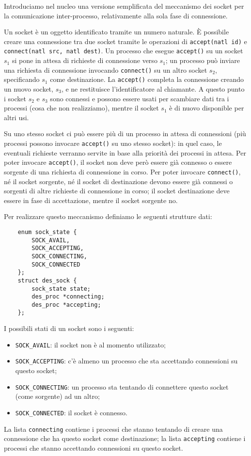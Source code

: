 Introduciamo nel nucleo una versione semplificata del meccanismo dei socket per
la comunicazione inter-processo, relativamente alla sola fase di connessione.

Un socket \`e un oggetto identificato tramite un numero naturale. \`E possibile
creare una connessione tra due socket tramite le operazioni di
\verb|accept(natl id)| e \verb|connect(natl src, natl dest)|.
Un processo che esegue \verb|accept()|
su un socket $s_1$ si pone in attesa di richieste di connessione verso $s_1$;
un processo pu\`o inviare una richiesta di connessione invocando \verb|connect()|
su un altro socket $s_2$, specificando $s_1$ come destinazione.
La \verb|accept()| completa la connessione creando un nuovo socket, $s_3$, e
ne restituisce l'identificatore al chiamante. A questo punto i socket $s_2$ e $s_3$
sono connessi e possono essere usati per scambiare dati tra i processi (cosa che
non realizziamo), mentre il socket $s_1$ \`e di nuovo disponible per altri usi.

Su uno stesso socket ci pu\`o essere pi\`u di un processo in attesa di connessioni
(pi\`u processi possono invocare \verb|accept()| su uno stesso socket):
in quel caso, le eventuali richieste verranno servite in base alla priorit\`a dei
processi in attesa. Per poter invocare \verb|accept()|, il socket non deve
per\`o essere gi\`a connesso o essere sorgente di una richiesta di connessione in corso.
Per poter invocare \verb|connect()|, n\'e il socket sorgente, n\'e il socket
di destinazione devono essere gi\`a connessi o sorgenti di altre richieste di connessione in corso;
il socket destinazione deve essere in fase di accettazione, mentre il socket sorgente no.

Per realizzare questo meccanismo definiamo le seguenti strutture dati:

\begin{verbatim}
    enum sock_state {
        SOCK_AVAIL,
        SOCK_ACCEPTING,
        SOCK_CONNECTING,
        SOCK_CONNECTED
    };
    struct des_sock {
        sock_state state;
        des_proc *connecting;
        des_proc *accepting;
    };
\end{verbatim}

I possibili stati di un socket sono i seguenti:
\begin{itemize}
  \item \verb|SOCK_AVAIL|: il socket non \`e al momento utilizzato;
  \item \verb|SOCK_ACCEPTING|: c'\`e almeno un processo che sta accettando connessioni
    su questo socket;
  \item \verb|SOCK_CONNECTING|: un processo sta tentando di connettere questo socket
    (come sorgente) ad un altro;
  \item \verb|SOCK_CONNECTED|: il socket \`e connesso.
\end{itemize}
La lista \verb|connecting| contiene i processi che stanno tentando di creare una connessione che
ha questo socket come destinazione; la lista \verb|accepting| contiene i processi che
stanno accettando connessioni su questo socket.

